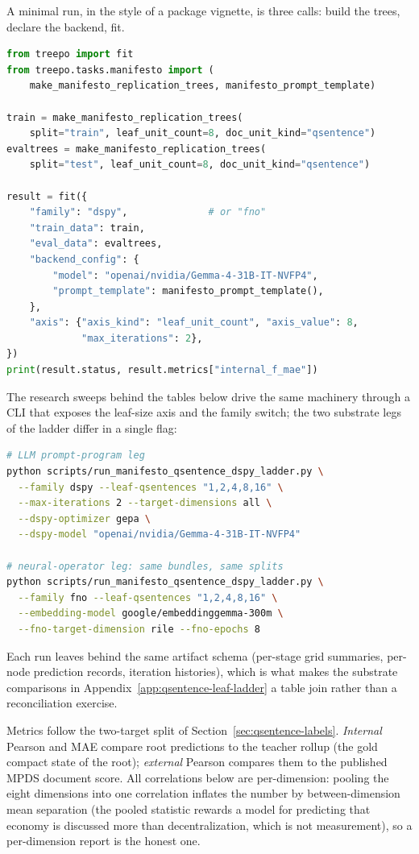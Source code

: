 A minimal run, in the style of a package vignette, is three calls:
build the trees, declare the backend, fit.
\begin{lstlisting}[language=Python]
from treepo import fit
from treepo.tasks.manifesto import (
    make_manifesto_replication_trees, manifesto_prompt_template)

train = make_manifesto_replication_trees(
    split="train", leaf_unit_count=8, doc_unit_kind="qsentence")
evaltrees = make_manifesto_replication_trees(
    split="test", leaf_unit_count=8, doc_unit_kind="qsentence")

result = fit({
    "family": "dspy",              # or "fno"
    "train_data": train,
    "eval_data": evaltrees,
    "backend_config": {
        "model": "openai/nvidia/Gemma-4-31B-IT-NVFP4",
        "prompt_template": manifesto_prompt_template(),
    },
    "axis": {"axis_kind": "leaf_unit_count", "axis_value": 8,
             "max_iterations": 2},
})
print(result.status, result.metrics["internal_f_mae"])
\end{lstlisting}
The research sweeps behind the tables below drive the same machinery
through a CLI that exposes the leaf-size axis and the family switch;
the two substrate legs of the ladder differ in a single flag:
\begin{lstlisting}[language=bash]
# LLM prompt-program leg
python scripts/run_manifesto_qsentence_dspy_ladder.py \
  --family dspy --leaf-qsentences "1,2,4,8,16" \
  --max-iterations 2 --target-dimensions all \
  --dspy-optimizer gepa \
  --dspy-model "openai/nvidia/Gemma-4-31B-IT-NVFP4"

# neural-operator leg: same bundles, same splits
python scripts/run_manifesto_qsentence_dspy_ladder.py \
  --family fno --leaf-qsentences "1,2,4,8,16" \
  --embedding-model google/embeddinggemma-300m \
  --fno-target-dimension rile --fno-epochs 8
\end{lstlisting}
Each run leaves behind the same artifact schema (per-stage grid
summaries, per-node prediction records, iteration histories), which is
what makes the substrate comparisons in
Appendix~\ref{app:qsentence-leaf-ladder} a table join rather than a
reconciliation exercise.

Metrics follow the two-target split of
Section~\ref{sec:qsentence-labels}. \emph{Internal} Pearson and MAE
compare root predictions to the teacher rollup (the gold compact state
of the root); \emph{external} Pearson compares them to the published
MPDS document score. All correlations below are per-dimension:
pooling the eight dimensions into one correlation inflates the number
by between-dimension mean separation (the pooled statistic rewards a
model for predicting that economy is discussed more than
decentralization, which is not measurement), so a per-dimension
report is the honest one.

